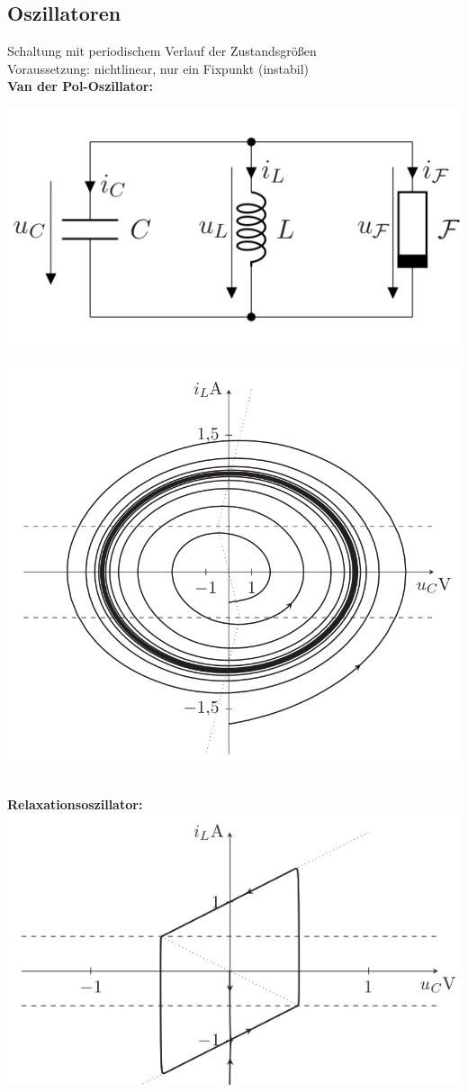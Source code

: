 \documentclass[fs, footer]{latex4ei}
\begin{document}
\begin{multicols*}{4}
\subsection{Oszillatoren}
Schaltung mit periodischem Verlauf der Zustandsgrößen\\
Voraussetzung: nichtlinear, nur ein Fixpunkt (instabil)\\
\textbf{Van der Pol-Oszillator:}\\
\parbox{.5\linewidth}{\includegraphics[width=\linewidth]{img/van-der-pol}}
\parbox{.5\linewidth}{\includegraphics[width=\linewidth]{img/fast-harmonischer-oszillator}}\\
\textbf{Relaxationsoszillator:}\\ 
\includegraphics[width=.5\linewidth]{img/relaxationsoszillator}

\end{multicols*}
\end{document}
